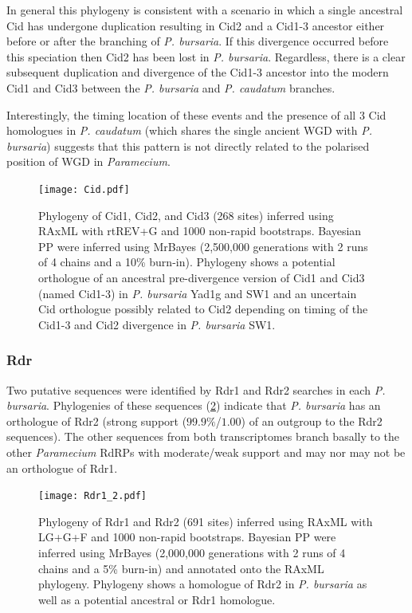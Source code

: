 In general this phylogeny is consistent with a scenario in which a
single ancestral Cid has undergone duplication resulting
in Cid2 and a Cid1-3 ancestor either before
or after the branching of \textit{P. bursaria}.
If this divergence occurred before this speciation
then Cid2 has been lost in \textit{P. bursaria}.
Regardless, there is a clear subsequent 
duplication and divergence of the Cid1-3 ancestor into the modern 
Cid1 and Cid3 
between the \textit{P. bursaria} and \textit{P. caudatum} branches.

Interestingly, the timing location of these events and the presence of 
all 3 Cid homologues in
\textit{P. caudatum} (which shares the single ancient WGD with \textit{P. bursaria})
suggests that this pattern is not
directly related to the polarised position of WGD in \textit{Paramecium}.  

\begin{figure}
    \texttt{[image: Cid.pdf]}
    \caption[Cid phylogeny]{
        Phylogeny of Cid1, Cid2, and Cid3 (268 sites) inferred
        using RAxML with rtREV+G and 1000 non-rapid bootstraps.
        Bayesian PP were inferred using MrBayes (2,500,000 generations 
        with 2 runs of 4 chains and a 10\% burn-in).  Phylogeny
        shows a potential orthologue of an ancestral pre-divergence
        version of Cid1 and Cid3 (named Cid1-3) in \textit{P. bursaria}
        Yad1g and SW1 and an uncertain Cid orthologue possibly
        related to Cid2 depending on timing of the Cid1-3 and Cid2 divergence
        in \textit{P. bursaria} SW1.}
    \label{fig:cidphlyo}
\end{figure}

\subsubsection{Rdr}

Two putative sequences were identified by Rdr1 and Rdr2 searches in each
\textit{P. bursaria}.  Phylogenies of these sequences (\cref{fig:rdr12_phylo})
indicate that \textit{P. bursaria} has an orthologue of
Rdr2 (strong support (\(99.9\%\)/\(1.00\)) of an outgroup to the Rdr2 sequences).
The other sequences from both transcriptomes branch basally
to the other \textit{Paramecium} RdRPs with moderate/weak support
and may nor may not be an orthologue of Rdr1.

\begin{figure}
    \texttt{[image: Rdr1\_2.pdf]}
    \caption[Rdr1 and Rdr2 phylogeny]{Phylogeny of Rdr1 and Rdr2
        (691 sites) inferred using RAxML with LG+G+F and 1000
        non-rapid bootstraps.  Bayesian PP were inferred using MrBayes
        (2,000,000 generations with 2 runs of 4 chains and a 5\% burn-in)
        and annotated onto the RAxML phylogeny. Phylogeny
        shows a homologue of Rdr2 in \textit{P. bursaria} as well
    as a potential ancestral or Rdr1 homologue.}
    \label{fig:rdr12_phylo}
\end{figure}

